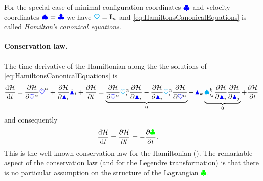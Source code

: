 For the special case of minimal configuration coordinates $\genCoord$ and velocity coordinates $\sysVel = \genCoordd$ we have $\kinMat = \idMat[\dimConfigSpace]$ and \eqref{eq:HamiltonsCanonicalEquations} is called \textit{Hamilton's canonical equations}.

\paragraph{Conservation law.}
The time derivative of the Hamiltonian along the the solutions of \eqref{eq:HamiltonsCanonicalEquations} is
\begin{align}\label{eq:BalanceHamiltonian}
 \diff[\Hamiltonian]{t} = \pdiff[\Hamiltonian]{\sysCoordCoeff{\GidxI}} \sysCoordCoeffd{\GidxI} + \pdiff[\Hamiltonian]{\genMomentumCoeff{\LidxI}} \genMomentumCoeffd{\LidxI} + \pdiff[\Hamiltonian]{t}
 = \underbrace{\pdiff[\Hamiltonian]{\sysCoordCoeff{\GidxI}} \kinMatCoeff{\GidxI}{\LidxI} \pdiff[\Hamiltonian]{\genMomentumCoeff{\LidxI}}
 - \pdiff[\Hamiltonian]{\genMomentumCoeff{\LidxI}} \kinMatCoeff{\GidxI}{\LidxI} \pdiff[\Hamiltonian]{\sysCoordCoeff{\GidxI}}}_{0}
 - \,\genMomentumCoeff{\LidxIII} \underbrace{\BoltzSym{\LidxIII}{\LidxI}{\LidxII} \pdiff[\Hamiltonian]{\genMomentumCoeff{\LidxI}} \pdiff[\Hamiltonian]{\genMomentumCoeff{\LidxII}}}_{0}
 + \pdiff[\Hamiltonian]{t}
\end{align}
and consequently
\begin{align}
 \diff[\Hamiltonian]{t} &= \pdiff[\Hamiltonian]{t} = -\pdiff[\Lagrangian]{t}.
\end{align}
This is the well known conservation law for the Hamiltonian (\eg \cite[ch.\,VI.6]{Lanczos:Variational}).
The remarkable aspect of the conservation law (and for the Legendre transformation) is that there is no particular assumption on the structure of the Lagrangian $\Lagrangian$.


